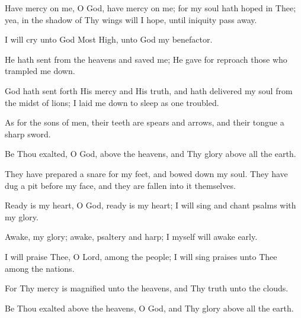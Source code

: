 Have mercy on me, O God, have mercy on me; for my soul hath hoped in Thee; yea, in the shadow of Thy wings will I hope, until iniquity pass away.

I will cry unto God Most High, unto God my benefactor.

He hath sent from the heavens and saved me; He gave for reproach those who trampled me down.

God hath sent forth His mercy and His truth, and hath delivered my soul from the midst of lions; I laid me down to sleep as one troubled.

As for the sons of men, their teeth are spears and arrows, and their tongue a sharp sword.

Be Thou exalted, O God, above the heavens, and Thy glory above all the earth.

They have prepared a snare for my feet, and bowed down my soul. They have dug a pit before my face, and they are fallen into it themselves.

Ready is my heart, O God, ready is my heart; I will sing and chant psalms with my glory.

Awake, my glory; awake, psaltery and harp; I myself will awake early.

I will praise Thee, O Lord, among the people; I will sing praises unto Thee among the nations.

For Thy mercy is magnified unto the heavens, and Thy truth unto the clouds.

Be Thou exalted above the heavens, O God, and Thy glory above all the earth.
